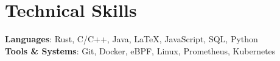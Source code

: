 \documentclass[letterpaper,11pt]{article}
\begin{document}
%
\section{Technical Skills}
 \begin{itemize}[leftmargin=0.15in, label={}]
    \small{\item{
     \textbf{Languages}{: Rust, C/C++, Java, \LaTeX, JavaScript, SQL, Python} \\
     \textbf{Tools \& Systems}{: Git, Docker, eBPF, Linux, Prometheus, Kubernetes} \\
    }}
 \end{itemize}


\nocite{*}
\printbibliography[title=Publications]
 
\end{document}
